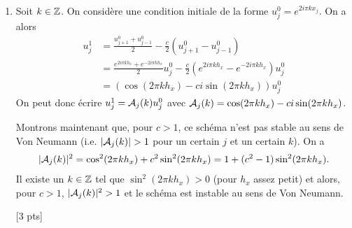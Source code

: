 \documentclass[12pt]{article}
\begin{document}
\begin{cor}
\begin{enumerate}
    [2 pts]
    
  \item
    Soit $k \in \mathbb{Z}$.
    On consid\`ere une condition initiale de la forme
    $u^0_j = e^{2i\pi k x_j}$.
    On a alors
    \begin{align*}
      u_j^1
      &= \frac{u_{j+1}^0 + u_{j-1}^0}{2} - \frac{c}2 (u_{j+1}^0 - u_{j-1}^0)
      \\
      &= \frac{e^{2i\pi k h_x} + e^{-2i\pi k h_x}}{2} u_j^0 - \frac{c}2 (e^{2i\pi k h_x} - e^{-2i\pi k h_x})u_j^0
      \\
      &= (\cos(2\pi k h_x) - ci \sin(2\pi k h_x)) u_j^0
    \end{align*}
    On peut donc \'ecrire $u_j^1 = \mathcal{A}_j(k) u_j^0$
    avec $\mathcal{A}_j(k) = \cos(2\pi k h_x) - ci \sin(2\pi k h_x)$.

    Montrons maintenant que, pour $c > 1$, ce sch\'ema n'est pas stable au sens de Von Neumann
    (i.e. $|\mathcal{A}_j(k)| > 1$ pour un certain $j$ et un certain $k$).
    On a
    \begin{align*}
      |\mathcal{A}_j(k)|^2
      = \cos^2(2\pi k h_x) + c^2 \sin^2(2\pi k h_x)
      = 1 + (c^2-1) \sin^2(2\pi k h_x) .
    \end{align*}
    Il existe un $k \in \mathbb{Z}$ tel que $\sin^2(2\pi k h_x) > 0$ (pour $h_x$ assez petit)
    et alors, pour $c > 1$, $|\mathcal{A}_j(k)|^2 > 1$ et le sch\'ema est instable au sens de Von Neumann.

    [3 pts]


\end{enumerate}
\end{cor}
\end{document}
